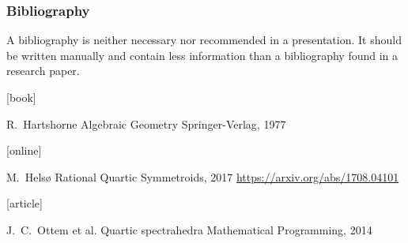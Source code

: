 \documentclass[UKenglish, unknownkeysallowed]{beamer}
\begin{document}
\begin{frame}
    \frametitle{Bibliography}

    A bibliography is neither necessary nor recommended in a presentation.
    It should be written manually and contain less information
    than a bibliography found in a research paper.

    \begin{thebibliography}{}

        [book]

        R.~Hartshorne
        \newblock Algebraic Geometry
        \newblock Springer-Verlag, 1977

        [online]

        M.~Helsø
        \newblock Rational Quartic Symmetroids, 2017
        \newblock \url{https://arxiv.org/abs/1708.04101}

        [article]

        J.~C.~Ottem et al.
        \newblock Quartic spectrahedra
        \newblock Mathematical Programming, 2014

    \end{thebibliography}
\end{frame}
\end{document}
